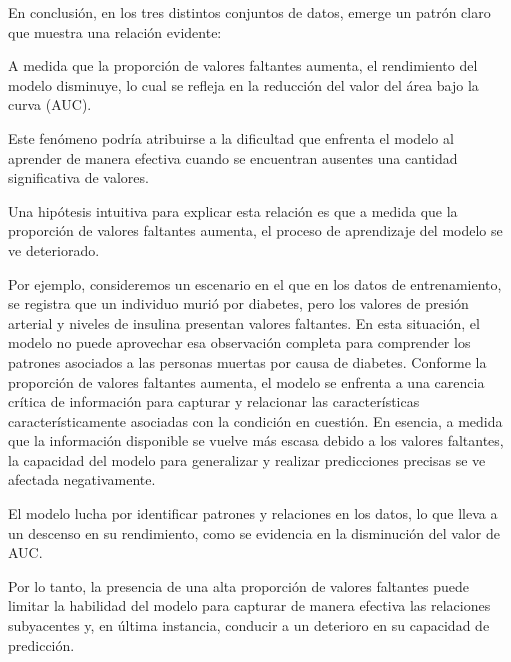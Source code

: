 \documentclass[
]{article}
\begin{document}
En conclusión, en los tres distintos conjuntos de datos, emerge un
patrón claro que muestra una relación evidente:

A medida que la proporción de valores faltantes aumenta, el rendimiento
del modelo disminuye, lo cual se refleja en la reducción del valor del
área bajo la curva (AUC).

Este fenómeno podría atribuirse a la dificultad que enfrenta el modelo
al aprender de manera efectiva cuando se encuentran ausentes una
cantidad significativa de valores.

Una hipótesis intuitiva para explicar esta relación es que a medida que
la proporción de valores faltantes aumenta, el proceso de aprendizaje
del modelo se ve deteriorado.

Por ejemplo, consideremos un escenario en el que en los datos de
entrenamiento, se registra que un individuo murió por diabetes, pero los
valores de presión arterial y niveles de insulina presentan valores
faltantes. En esta situación, el modelo no puede aprovechar esa
observación completa para comprender los patrones asociados a las
personas muertas por causa de diabetes. Conforme la proporción de
valores faltantes aumenta, el modelo se enfrenta a una carencia crítica
de información para capturar y relacionar las características
característicamente asociadas con la condición en cuestión. En esencia,
a medida que la información disponible se vuelve más escasa debido a los
valores faltantes, la capacidad del modelo para generalizar y realizar
predicciones precisas se ve afectada negativamente.

El modelo lucha por identificar patrones y relaciones en los datos, lo
que lleva a un descenso en su rendimiento, como se evidencia en la
disminución del valor de AUC.

Por lo tanto, la presencia de una alta proporción de valores faltantes
puede limitar la habilidad del modelo para capturar de manera efectiva
las relaciones subyacentes y, en última instancia, conducir a un
deterioro en su capacidad de predicción.

\hypertarget{section}{%
\subsection{}\label{section}}
\end{document}
